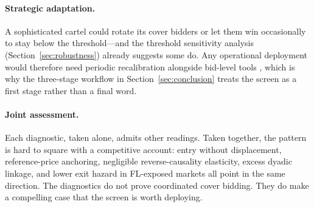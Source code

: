 \paragraph{Strategic adaptation.}
A sophisticated cartel could rotate its cover bidders or let them
win occasionally to stay below the threshold---and the threshold
sensitivity analysis (Section~\ref{sec:robustness}) already suggests
some do. Any operational deployment would therefore need periodic
recalibration alongside bid-level tools
\citep{harrington2008detecting}, which is why the three-stage
workflow in Section~\ref{sec:conclusion} treats the screen as a
first stage rather than a final word.

\paragraph{Joint assessment.}
Each diagnostic, taken alone, admits other readings. Taken together,
the pattern is hard to square with a competitive account: entry
without displacement, reference-price anchoring, negligible
reverse-causality elasticity, excess dyadic linkage, and lower exit
hazard in FL-exposed markets all point in the same direction. The
diagnostics do not prove coordinated cover bidding. They do make a
compelling case that the screen is worth deploying.


